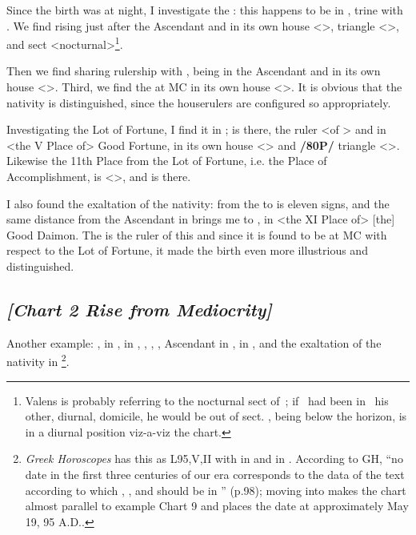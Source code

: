 Since the birth was at night, I investigate the \Moon: this
happens to be in \Cancer, trine with \Mars. We find \Mars\xspace rising just after the Ascendant and in its own
house <\Scorpio>, triangle <\Scorpio\xspace\Pisces\xspace \Cancer>, and sect <nocturnal>\footnote{Valens is probably referring to the nocturnal sect of \Scorpio\,; if \Mars\, had been in \Aries\, his other, diurnal, domicile, he would be out of sect. \Mars, being below the horizon, is in a diurnal position viz-a-viz the chart.}. 

Then we find \Venus\xspace sharing rulership with \Mars, being in the Ascendant and in its own house <\Libra>. Third, we find the \Moon\xspace at MC in its own house <\Cancer>. It is obvious that the nativity is distinguished, since the houserulers are configured so appropriately. 

Investigating the Lot of Fortune, I find it in \Aquarius; \Saturn\xspace is there, the ruler <of \Aquarius> and in <the V Place of> Good Fortune, in its own house <\Aquarius> and \textbf{/80P/} triangle <\Aquarius\xspace \Libra\xspace \Gemini>. Likewise the 11th Place from the Lot of Fortune, i.e. the Place of Accomplishment, is <\Sagittarius>, and \Jupiter\xspace is there.

I also found the exaltation of the nativity: from the \Moon\xspace to \Taurus\xspace is eleven signs, and the same distance from the Ascendant in \Libra\xspace brings me to \Leo, in <the XI Place of> [the] Good Daimon. The \Sun\xspace is the ruler of this and since it is found to be at MC with respect to the Lot of Fortune, it made the birth even more illustrious and distinguished.
\newpage
\subsection*{\textit{[Chart 2 Rise from Mediocrity]}}

Another example: \Sun, \Mercury\xspace in \Taurus, \Moon\xspace in \Aries, \Saturn, \Mars, \Venus, Ascendant in \Cancer,
\Jupiter\xspace in \Capricorn, \Fortune\xspace and the exaltation of the nativity in \Gemini
\footnote{\textit{Greek Horoscopes} has this as L95,V,II with \Saturn\xspace in \Leo\xspace and \Jupiter\xspace in \Virgo. According to GH, ``no date in the first three centuries of our era corresponds to the data of the text according to which \Saturn, \Mars, and \Venus\xspace should be in \Cancer'' (p.98); moving \Saturn\xspace into \Leo\xspace makes the chart almost parallel to example Chart 9 and places the date at approximately May 19, 95 A.D..}.

